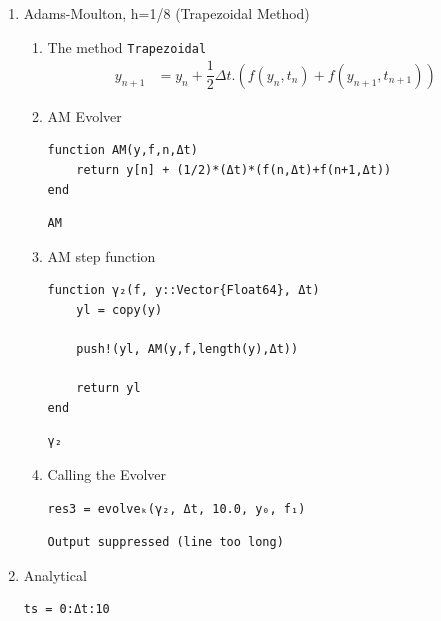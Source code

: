 \documentclass[11pt]{article}
\begin{document}
\begin{enumerate}
\begin{enumerate}
\item Adams-Moulton, h=1/8 (Trapezoidal Method)
\label{sec:orgc4b95b2}
\begin{enumerate}
  \item The method
\label{sec:org316a53d}
\texttt{Trapezoidal}
\begin{equation}
\begin{aligned}
y_{n+1}&=y_n + \dfrac{1}{2}\Delta{t}.(f(y_n, t_n) + f(y_{n+1}, t_{n+1}))
\end{aligned}
\end{equation}
\item AM Evolver
\label{sec:orgf254161}
\begin{verbatim}
function AM(y,f,n,Δt)
    return y[n] + (1/2)*(Δt)*(f(n,Δt)+f(n+1,Δt))
end
\end{verbatim}

\begin{verbatim}
AM
\end{verbatim}

\item AM step function
\label{sec:org83db08f}
\begin{verbatim}
function γ₂(f, y::Vector{Float64}, Δt)
    yl = copy(y)

    push!(yl, AM(y,f,length(y),Δt))

    return yl
end
\end{verbatim}

\begin{verbatim}
γ₂
\end{verbatim}

\item Calling the Evolver
\label{sec:org6863662}
\begin{verbatim}
res3 = evolveₖ(γ₂, Δt, 10.0, y₀, f₁)
\end{verbatim}

\begin{verbatim}
Output suppressed (line too long)
\end{verbatim}
\end{enumerate}

\item Analytical
\label{sec:org7d2f946}
\begin{verbatim}
ts = 0:Δt:10
\end{verbatim}


\end{enumerate}
\end{enumerate}
\end{document}
